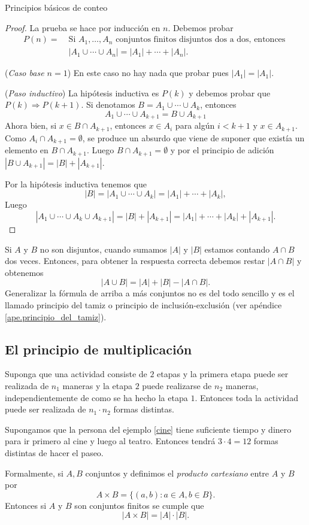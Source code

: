 \begin{section}{Principios básicos de conteo}
\begin{proof} 
La  prueba se hace por inducción en $n$. Debemos probar 
\begin{align*}
P(n) =\; &\text{Si $A_1,\ldots,A_n$ conjuntos finitos disjuntos dos a dos, entonces }\\  &|A_1 \cup \cdots \cup A_n| =|A_1|+\cdots+|A_n|.
\end{align*}

\noindent({\em Caso base $n=1$}) En este caso no hay nada que probar pues  $|A_1|=|A_1|$.

\noindent({\em Paso inductivo}) La hipótesis inductiva es $P(k)$ y debemos probar que $P(k) \Rightarrow P(k+1)$. Si denotamos $B = A_1 \cup \cdots \cup A_k$, entonces 
$$
A_1 \cup \cdots \cup A_{k+1} = B \cup A_{k+1}
$$
Ahora bien, si $x \in B \cap A_{k+1}$, entonces $x \in A_i$ para algún $i < k+1$ y $x \in A_{k+1}$. Como $A_{i} \cap A_{k+1} = \emptyset$, se produce un absurdo  que viene de suponer que existía un elemento en $B \cap A_{k+1}$. Luego   $B \cap A_{k+1}= \emptyset$ y por el principio de adición  $|B \cup A_{k+1}| = |B|+|A_{k+1}|$. 

Por la hipótesis inductiva tenemos que 
$$
|B| = |A_1 \cup \cdots \cup A_k| =|A_1|+\cdots+|A_k|,
$$
Luego
$$
|A_1 \cup \cdots \cup A_k \cup  A_{k+1}| = |B|+|A_{k+1}| = |A_1|+\cdots+|A_k|+|A_{k+1}|.
$$
\end{proof}



Si $A$ y $B$ no son disjuntos, cuando sumamos $|A|$ y $|B|$ estamos contando $A \cap B$ dos veces. Entonces, para
obtener la respuesta correcta debemos restar $|A \cap B|$ y obtenemos
$$
|A \cup B| = |A|+|B| - |A \cap B|.
$$
Generalizar la fórmula de arriba a más conjuntos no es del todo sencillo y es el  llamado principio del tamiz o principio de inclusión-exclusión (ver apéndice \ref{ape.principio_del_tamiz}). 



\subsection*{El principio de multiplicación}

Suponga que una actividad consiste de $2$ etapas y la primera etapa puede ser realizada de $n_1$ maneras y la etapa $2$  puede realizarse de $n_2$  maneras, independientemente de como se ha hecho la etapa $1$. Entonces toda la actividad puede ser realizada de $n_1\cdot n_2$  formas distintas.


\begin{ejemplo*}
Supongamos que la persona del ejemplo \ref{cine} tiene suficiente tiempo y dinero para ir primero al cine y luego al teatro. Entonces tendrá  $3 \cdot 4=12$ formas distintas de hacer el paseo.
\end{ejemplo*}


Formalmente, si $A,B$ conjuntos y definimos el {\em producto cartesiano} entre $A$ y $B$ por
$$
A \times B = \{(a,b): a \in A, b \in B\}.
$$
Entonces si $A$ y $B$ son conjuntos finitos se cumple que
$$
|A \times B| = |A|\cdot|B|.  
$$

\end{section}


